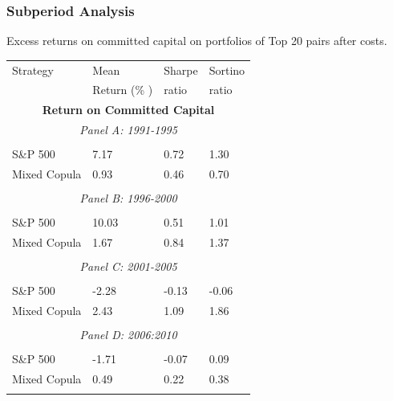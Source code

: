 \documentclass[pdf,10pt,xcolor=dvipsnames,hide notes]{beamer}
\begin{document}
\begin{frame}

\frametitle{Subperiod Analysis}
\begin{threeparttable}[H]
	\centering \tiny
	\caption{Excess returns on committed capital on portfolios of Top 20 pairs after costs. }
	\begin{tabularx}{\textwidth}{@{\extracolsep{\fill}}llll@{}}
		\toprule
		Strategy & Mean  & Sharpe & Sortino \\
		& Return (\% ) & ratio &  ratio     \\
		\midrule
		\multicolumn{4}{c}{\textbf{Return on Committed Capital}} \\
		\multicolumn{4}{c}{\textit{Panel A: 1991-1995}} \\
		&       &       &       \\
		S\&P 500 & 7.17  & 0.72  & 1.30 \\
		Mixed Copula & 0.93  & 0.46  & 0.70 \\
		\multicolumn{1}{r}{} & \multicolumn{1}{r}{} & \multicolumn{1}{r}{} & \multicolumn{1}{r}{} \\
		\multicolumn{4}{c}{\textit{Panel B: 1996-2000}} \\
		&       &       &       \\
		S\&P 500 & 10.03  & 0.51  & 1.01 \\
		Mixed Copula & 1.67  & 0.84  & 1.37 \\
		\multicolumn{1}{r}{} & \multicolumn{1}{r}{} & \multicolumn{1}{r}{} & \multicolumn{1}{r}{} \\
		\multicolumn{4}{c}{\textit{Panel C: 2001-2005}} \\
		&       &       &       \\
		S\&P 500 & -2.28  & \cellcolor{Melon} -0.13  & -0.06 \\
		Mixed Copula & 2.43  & \cellcolor{corn} 1.09  & 1.86 \\
		\multicolumn{1}{r}{} & \multicolumn{1}{r}{} & \multicolumn{1}{r}{} & \multicolumn{1}{r}{} \\
		\multicolumn{4}{c}{\textit{Panel D: 2006:2010}} \\
		&       &       &       \\
		S\&P 500 & -1.71  & \cellcolor{Melon} -0.07  & 0.09 \\
		Mixed Copula & 0.49  & \cellcolor{corn} 0.22  & 0.38 \\
		\multicolumn{1}{r}{} & \multicolumn{1}{r}{} & \multicolumn{1}{r}{} & \multicolumn{1}{r}{} \\

\end{tabularx}
\end{threeparttable}
\end{frame}
\end{document}
